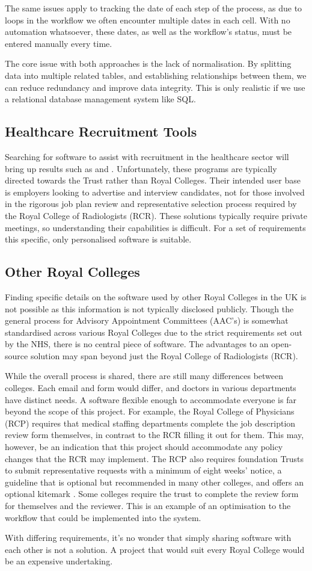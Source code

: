 The same issues apply to tracking the date of each step of the process, as due to loops in the workflow we often encounter multiple dates in each cell. With no automation whatsoever, these dates, as well as the workflow’s status, must be entered manually every time.

The core issue with both approaches is the lack of normalisation. By splitting data into multiple related tables, and establishing relationships between them, we can reduce redundancy and improve data integrity. This is only realistic if we use a relational database management system like SQL.

\subsection{Healthcare Recruitment Tools}
Searching for software to assist with recruitment in the healthcare sector will bring up results such as \textcite{icims_icims_nodate} and \textcite{the_access_group_access_nodate}. Unfortunately, these programs are typically directed towards the Trust rather than Royal Colleges. Their intended user base is employers looking to advertise and interview candidates, not for those involved in the rigorous job plan review and representative selection process required by the Royal College of Radiologists (RCR). These solutions typically require private meetings, so understanding their capabilities is difficult. For a set of requirements this specific, only personalised software is suitable.

\subsection{Other Royal Colleges}
Finding specific details on the software used by other Royal Colleges in the UK is not possible as this information is not typically disclosed publicly. Though the general process for Advisory Appointment Committees (AAC’s) is somewhat standardised across various Royal Colleges due to the strict requirements set out by the NHS, there is no central piece of software. The advantages to an open-source solution may span beyond just the Royal College of Radiologists (RCR). 

While the overall process is shared, there are still many differences between colleges. Each email and form would differ, and doctors in various departments have distinct needs. A software flexible enough to accommodate everyone is far beyond the scope of this project. For example, the Royal College of Physicians (RCP) requires that medical staffing departments complete the job description review form themselves, in contrast to the RCR filling it out for them. This may, however, be an indication that this project should accommodate any policy changes that the RCR may implement. The RCP also requires foundation Trusts to submit representative requests with a minimum of eight weeks’ notice, a guideline that is optional but recommended in many other colleges, and offers an optional kitemark \parencite{royal_college_of_physicians_of_london_rcp_2017}. Some colleges require the trust to complete the review form for themselves and the reviewer. This is an example of an optimisation to the workflow that could be implemented into the system.

With differing requirements, it’s no wonder that simply sharing software with each other is not a solution. A project that would suit every Royal College would be an expensive undertaking.